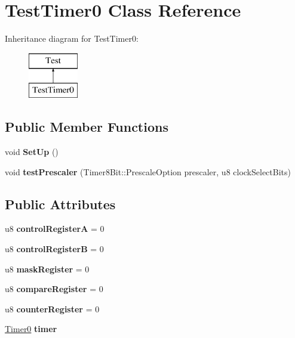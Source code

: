 \hypertarget{class_test_timer0}{}\section{Test\+Timer0 Class Reference}
\label{class_test_timer0}
Inheritance diagram for Test\+Timer0\+:\begin{figure}[H]
\begin{center}
\leavevmode
\includegraphics[height=2.000000cm]{class_test_timer0}
\end{center}
\end{figure}
\subsection*{Public Member Functions}
\begin{DoxyCompactItemize}
\item 
\mbox{\label{class_test_timer0_abb854fcebd77c9d93b5154f6ada10ebb}} 
void {\bfseries Set\+Up} ()
\item 
\mbox{\label{class_test_timer0_a9d9b41cb2775201328c8123cb9d26950}} 
void {\bfseries test\+Prescaler} (Timer8\+Bit\+::\+Prescale\+Option prescaler, u8 clock\+Select\+Bits)
\end{DoxyCompactItemize}
\subsection*{Public Attributes}
\begin{DoxyCompactItemize}
\item 
\mbox{\label{class_test_timer0_aa22a6242e48d5315ea17a1a001c819dd}} 
u8 {\bfseries control\+RegisterA} = 0
\item 
\mbox{\label{class_test_timer0_a2d800f86dd254e32cab71fb5595d4391}} 
u8 {\bfseries control\+RegisterB} = 0
\item 
\mbox{\label{class_test_timer0_a23a7a97c609bb8a7ea3307266481e26b}} 
u8 {\bfseries mask\+Register} = 0
\item 
\mbox{\label{class_test_timer0_a1d81a0a9c8767abd53ecf3b03caaf713}} 
u8 {\bfseries compare\+Register} = 0
\item 
\mbox{\label{class_test_timer0_a9ae8de68b76b9eaa674c308d3766f346}} 
u8 {\bfseries counter\+Register} = 0
\item 
\mbox{\hyperlink{class_timer0}{Timer0}} {\bfseries timer}
\end{DoxyCompactItemize}


